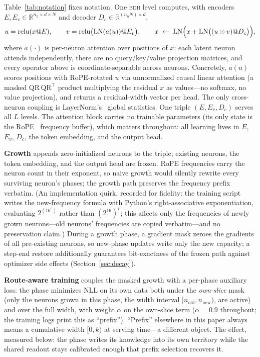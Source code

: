 \documentclass[11pt]{article}
\theoremstyle{definition}\newtheorem{definition}{Definition}
\theoremstyle{remark}\newtheorem{remark}{Remark}
\newcommand{\BDH}{\textsc{bdh}}
\begin{document}
Table~\ref{tab:notation} fixes notation. One \BDH{} level computes, with encoders
$E,E_v\in\mathbb{R}^{n_h\times d\times N}$ and decoder $D_c\in\mathbb{R}^{(n_hN)\times d}$,
\[
u=\operatorname{relu}(x@E),\qquad
v=\operatorname{relu}\bigl(\operatorname{LN}(a(u))@E_v\bigr),\qquad
x \;\leftarrow\; \operatorname{LN}\Bigl(x+\operatorname{LN}\bigl((u\odot v)@D_c\bigr)\Bigr),
\]
where $a(\cdot)$ is per-neuron attention over positions of $x$: each latent neuron attends
independently, there are no query/key/value projection matrices, and every operator above is
coordinate-separable across neurons. Concretely, $a(u)$ scores positions with RoPE-rotated
$u$ via unnormalized causal linear attention (a masked $\mathrm{QR}\,\mathrm{QR}^{\!\top}$
product multiplying the residual $x$ as values---no softmax, no value projection), and
returns a residual-width vector per head. The only cross-neuron coupling is LayerNorm's~\cite{layernorm} global
statistics. One triple $(E,E_v,D_c)$ serves all $L$ levels. The attention block carries no
trainable parameters (its only state is the RoPE~\cite{rope} frequency buffer), which matters throughout:
all learning lives in $E$, $E_v$, $D_c$, the token embedding, and the output head.

\textbf{Growth} appends zero-initialized neurons to the triple; existing neurons, the token
embedding, and the output head are frozen. RoPE frequencies carry the neuron count in their
exponent, so naive growth would silently rewrite every surviving neuron's phases; the
growth path preserves the frequency prefix verbatim. (An implementation quirk, recorded for
fidelity: the training script writes the new-frequency formula with Python's
right-associative exponentiation, evaluating $2^{(16^{r})}$ rather than $(2^{16})^{r}$;
this affects only the frequencies of newly grown neurons---old neurons' frequencies are
copied verbatim---and no preservation claim.) During a growth phase, a gradient mask
zeroes the gradients of all pre-existing neurons, so new-phase updates write only the new
capacity; a step-end restore additionally guarantees bit-exactness of the frozen path against
optimizer side effects (Section~\ref{sec:decay}).

\textbf{Route-aware training} couples the masked growth with a per-phase auxiliary loss:
the phase minimizes NLL on its own data both under the \emph{own-slice} mask (only the
neurons grown in this phase, the width interval $[n_{\mathrm{old}},n_{\mathrm{new}})$, are
active) and over the full width, with weight $\alpha$ on the own-slice term ($\alpha=0.9$
throughout; the training logs print this as ``prefix''). ``Prefix'' elsewhere in this
paper always means a cumulative width $[0,k)$ at serving time---a different object. The
effect, measured below: the phase writes its knowledge into its own territory while the
shared readout stays calibrated enough that prefix selection recovers it.
\end{document}
